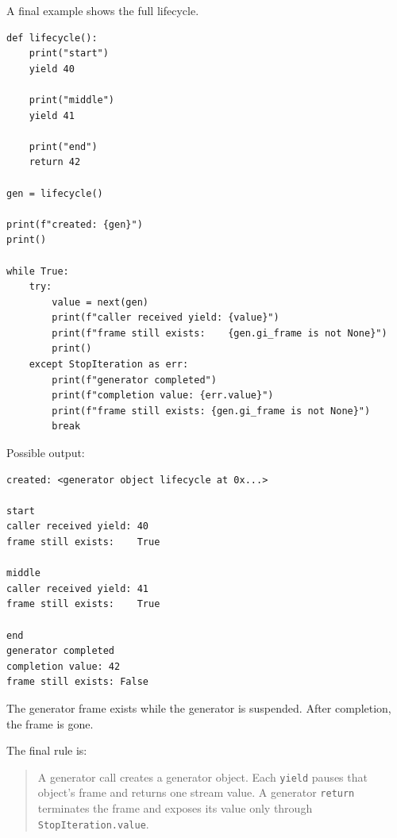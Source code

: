 A final example shows the full lifecycle.

\begin{verbatim}
def lifecycle():
    print("start")
    yield 40

    print("middle")
    yield 41

    print("end")
    return 42

gen = lifecycle()

print(f"created: {gen}")
print()

while True:
    try:
        value = next(gen)
        print(f"caller received yield: {value}")
        print(f"frame still exists:    {gen.gi_frame is not None}")
        print()
    except StopIteration as err:
        print(f"generator completed")
        print(f"completion value: {err.value}")
        print(f"frame still exists: {gen.gi_frame is not None}")
        break
\end{verbatim}

Possible output:

\begin{verbatim}
created: <generator object lifecycle at 0x...>

start
caller received yield: 40
frame still exists:    True

middle
caller received yield: 41
frame still exists:    True

end
generator completed
completion value: 42
frame still exists: False
\end{verbatim}

The generator frame exists while the generator is suspended. After completion, the frame is gone.

The final rule is:

\begin{quote}
A generator call creates a generator object. Each \texttt{yield} pauses that object's frame and returns one stream value. A generator \texttt{return} terminates the frame and exposes its value only through \texttt{StopIteration.value}.
\end{quote}
